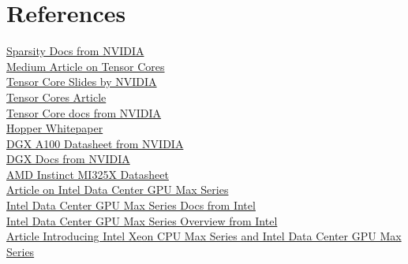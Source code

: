 \documentclass[12pt]{article}
\begin{document}
\section{References}
\href{https://developer.nvidia.com/blog/structured-sparsity-in-the-nvidia-ampere-architecture-and-applications-in-search-engines/#:~:text=NVIDIA%20Ampere%20and%20NVIDIA%20Hopper%20architecture%20GPUs%20add,Tensor%20Cores%2C%20which%20require%20a%202%3A4%20sparsity%20pattern}{Sparsity Docs from NVIDIA}\\
\href{https://medium.com/@rowanbrooks.cloudies/cuda-cores-vs-tensor-cores-which-one-is-right-706275ffc1aa}{Medium Article on Tensor Cores}\\
\href{https://developer.download.nvidia.com/video/gputechconf/gtc/2020/presentations/s21929-tensor-core-performance-on-nvidia-gpus-the-ultimate-guide.pdf}{Tensor Core Slides by NVIDIA}\\
\href{https://www.trustedreviews.com/explainer/what-are-tensor-cores-4422136}{Tensor Cores Article}\\
\href{https://www.nvidia.com/en-us/data-center/tensor-cores/}{Tensor Core docs from NVIDIA}\\
\href{https://resources.nvidia.com/en-us-tensor-core}{Hopper Whitepaper}\\
\href{https://www.nvidia.com/content/dam/en-zz/Solutions/Data-Center/nvidia-dgx-a100-datasheet.pdf}{DGX A100 Datasheet from NVIDIA}\\
\href{https://docs.nvidia.com/dgx-systems/index.html}{DGX Docs from NVIDIA}\\
\href{https://www.amd.com/content/dam/amd/en/documents/instinct-tech-docs/product-briefs/instinct-mi325x-datasheet.pdf}{AMD Instinct MI325X Datasheet}\\
\href{https://www.servethehome.com/new-intel-data-center-gpu-max-at-sc22-including-pcie-and-oam/}{Article on Intel Data Center GPU Max Series}\\
\href{https://www.intel.com/content/www/us/en/products/sku/232876/intel-data-center-gpu-max-1100/specifications.html}{Intel Data Center GPU Max Series Docs from Intel}\\
\href{https://www.intel.com/content/www/us/en/developer/articles/technical/intel-data-center-gpu-max-series-overview.html}{Intel Data Center GPU Max Series Overview from Intel}\\
\href{https://www.storagereview.com/news/intel-xeon-cpu-max-series-and-intel-data-center-gpu-max-series-introduced}{Article Introducing Intel Xeon CPU Max Series and Intel Data Center GPU Max Series}\\
\end{document}

